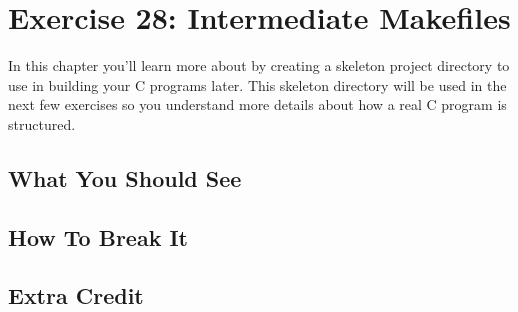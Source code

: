 \chapter{Exercise 28: Intermediate Makefiles}

In this chapter you'll learn more about  by creating
a skeleton project directory to use in building your C programs
later.  This skeleton directory will be used in the next few
exercises so you understand more details about how a real 
C program is structured.

\section{What You Should See}


\section{How To Break It}


\section{Extra Credit}



